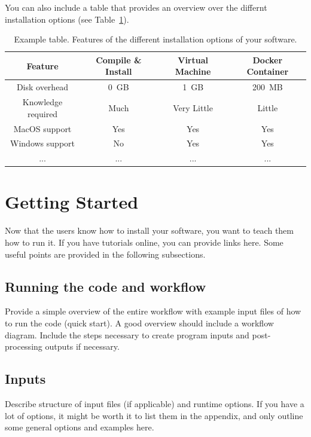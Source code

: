 \documentclass{article}
\begin{document}
You can also include a table that provides an overview over the differnt installation options (see Table~\ref{tab:install-options}). 

\begin{table}[htb]
  \center
  \begin{tabular}{|c|ccc|}
    \hline
    Feature & Compile \& Install & Virtual Machine & Docker Container \\
    \hline
    Disk overhead           & 0~GB  & 1~GB        & 200~MB \\
    Knowledge required      & Much  & Very Little & Little \\
    MacOS support           & Yes   & Yes         & Yes    \\
    Windows support         & No    & Yes         & Yes    \\
    ...                     & ...   & ...         & ... \\ \hline
  \end{tabular}
  \caption{Example table. Features of the different installation options of your software.}
  \label{tab:install-options}
\end{table}

\section{Getting Started}

Now that the users know how to install your software, you want to teach them how to run it. If you have tutorials online, you can provide links here. 
Some useful points are provided in the following subsections. 

\subsection{Running the code and workflow} 
Provide a simple overview of the entire workflow with example input files of how to run the code (quick start).
A good overview should include a workflow diagram. Include the steps necessary to create program inputs and post-processing outputs if necessary.

\subsection{Inputs} 
Describe structure of input files (if applicable) and runtime options.
If you have a lot of options, it might be worth it to list them in the appendix, and only outline some general options and examples here. 
\end{document}
